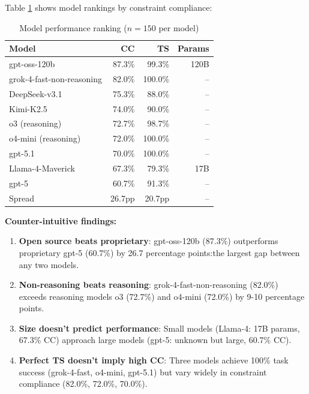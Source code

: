 \documentclass[11pt]{article}
\begin{document}
Table \ref{tab:model_performance} shows model rankings by constraint compliance:

\begin{table}[h]
\centering
\small
\begin{tabular}{lrrr}
\toprule
\textbf{Model} & \textbf{CC} & \textbf{TS} & \textbf{Params} \\
\midrule
gpt-oss-120b & 87.3\% & 99.3\% & 120B \\
grok-4-fast-non-reasoning & 82.0\% & 100.0\% & -- \\
DeepSeek-v3.1 & 75.3\% & 88.0\% & -- \\
Kimi-K2.5 & 74.0\% & 90.0\% & -- \\
o3 (reasoning) & 72.7\% & 98.7\% & -- \\
o4-mini (reasoning) & 72.0\% & 100.0\% & -- \\
gpt-5.1 & 70.0\% & 100.0\% & -- \\
Llama-4-Maverick & 67.3\% & 79.3\% & 17B \\
gpt-5 & 60.7\% & 91.3\% & -- \\
\midrule
Spread & 26.7pp & 20.7pp & -- \\
\bottomrule
\end{tabular}
\caption{Model performance ranking ($n=150$ per model)}
\label{tab:model_performance}
\end{table}

\textbf{Counter-intuitive findings:}

\begin{enumerate}
\item \textbf{Open source beats proprietary}: gpt-oss-120b (87.3\%) outperforms proprietary gpt-5 (60.7\%) by 26.7 percentage points:the largest gap between any two models.

\item \textbf{Non-reasoning beats reasoning}: grok-4-fast-non-reasoning (82.0\%) exceeds reasoning models o3 (72.7\%) and o4-mini (72.0\%) by 9-10 percentage points.

\item \textbf{Size doesn't predict performance}: Small models (Llama-4: 17B params, 67.3\% CC) approach large models (gpt-5: unknown but large, 60.7\% CC).

\item \textbf{Perfect TS doesn't imply high CC}: Three models achieve 100\% task success (grok-4-fast, o4-mini, gpt-5.1) but vary widely in constraint compliance (82.0\%, 72.0\%, 70.0\%).
\end{enumerate}
\end{document}
